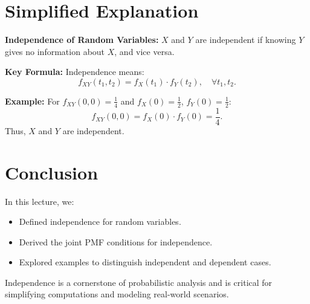 \documentclass{article}
\begin{document}
\section*{Simplified Explanation}

\textbf{Independence of Random Variables:}
$X$ and $Y$ are independent if knowing $Y$ gives no information about $X$, and vice versa.

\textbf{Key Formula:}
Independence means:
\[
  f_{XY}(t_1, t_2) = f_X(t_1) \cdot f_Y(t_2), \quad \forall t_1, t_2.
\]

\textbf{Example:}
For $f_{XY}(0, 0) = \frac{1}{4}$ and $f_X(0) = \frac{1}{2}$, $f_Y(0) = \frac{1}{2}$:
\[
  f_{XY}(0, 0) = f_X(0) \cdot f_Y(0) = \frac{1}{4}.
\]
Thus, $X$ and $Y$ are independent.

\section*{Conclusion}

In this lecture, we:
\begin{itemize}
  \item Defined independence for random variables.
  \item Derived the joint PMF conditions for independence.
  \item Explored examples to distinguish independent and dependent cases.
\end{itemize}

Independence is a cornerstone of probabilistic analysis and is critical for simplifying computations and modeling real-world scenarios.
\end{document}
